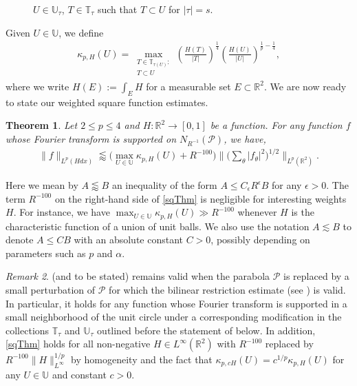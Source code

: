 \documentclass[11pt]{amsart}
\newtheorem{theorem}{Theorem}[section]
\theoremstyle{definition}
\theoremstyle{remark}
\newtheorem{remark}[theorem]{Remark}
\newcommand{\R}{\mathbb{R}}
\newcommand{\cP}{\mathcal{P}}
\newcommand{\T}{\mathbb{T}}
\newcommand{\U}{\mathbb{U}}
\newcommand{\les}{\lesssim}
\newcommand{\less}{\lessapprox}
\newcommand{\eps}{\epsilon}
\begin{document}
\begin{figure}\label{tubes}

	\caption{ $U\in \U_\tau$, $T\in \T_\tau$ such that $T\subset U$ for $|\tau|=s$.}
\end{figure}

Given $U\in \U$, we define
\begin{align}\label{kappa_def}
\kappa_{p,H}(U) =   \max_{\substack{T \in \T_{\tau(U)}:\\ T\subset U}} \left(\frac{H(T)}{|T|}\right)^{\frac{1}{4}}\left(\frac{H(U)}{|U|}\right)^{\frac{1}{p}-\frac{1}{4}},
\end{align}
where we write $H(E) := \int_{E} H$ for a measurable set $E\subset \R^2$.
We are now ready to state our weighted square function estimates. 
\begin{theorem}\label{cor:sqweighted}
	Let $2\leq p\leq 4$ and $H:\R^2 \to [0,1]$ be a   function. For any function $f$ whose Fourier transform is supported on $N_{R^{-1}} (\cP)$,  we have, 
	\begin{align}\label{sqThm}
		\|f\|_{L^p(Hd x)} \less  \big(\max_{U\in \U} \kappa_{p,H}(U) +R^{-100} \big) \big\| \big(\sum_\theta |f_\theta|^2 \big)^{1/2}\big\|_{L^p(\R^2)}.
	\end{align}
\end{theorem}
Here we mean by $A \less B$  an inequality of the form $A \leq C_{\eps} R^\eps B$ for any $\eps>0$. The term   $R^{-100}$ on the right-hand side of \eqref{sqThm} is negligible for  interesting weights $H$. For instance, we have $\max_{U\in \U} \kappa_{p,H}(U) \gg R^{-100}$ whenever $H$ is the characteristic function of a union of unit balls. 
We also use the notation $A \les B$ to denote $A\leq C B$ with an absolute constant  $C>0$,
possibly depending on parameters such as $p$ and $\alpha$. 


\begin{remark}
   (and  to be stated) remains valid when the parabola $\cP$ is replaced by a small perturbation of $\cP$ for which the bilinear restriction estimate (see ) is valid. In particular, it holds for any function whose Fourier transform is supported in a small neighborhood of the unit circle under a corresponding modification in the collections $\T_\tau$ and $\U_\tau$ outlined before the statement of  below. In addition, \eqref{sqThm} holds for all non-negative $H\in L^\infty(\R^2)$ with $R^{-100}$  replaced by $R^{-100}  \| H\|_{L^\infty}^{1/p}$ by homogeneity and the fact that $\kappa_{p,cH}(U) = c^{1/p}\kappa_{p,H}(U)$ for any $U\in \U$ and constant $c>0$. 
\end{remark}
\end{document}
